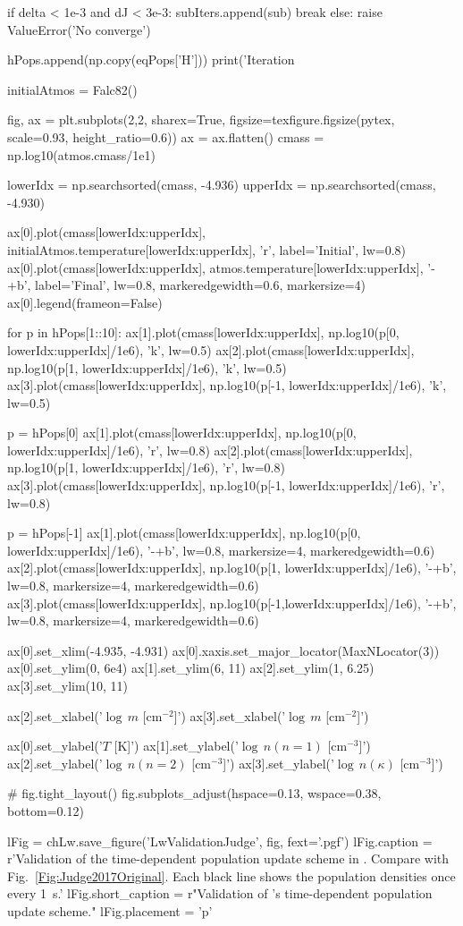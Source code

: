 \begin{pycode}[Lw]
        if delta < 1e-3 and dJ < 3e-3:
            subIters.append(sub)
            break
    else:
        raise ValueError('No converge')

    hPops.append(np.copy(eqPops['H']))
    print('Iteration %


initialAtmos = Falc82()

fig, ax = plt.subplots(2,2, sharex=True, figsize=texfigure.figsize(pytex, scale=0.93, height_ratio=0.6))
ax = ax.flatten()
cmass = np.log10(atmos.cmass/1e1)

lowerIdx = np.searchsorted(cmass, -4.936)
upperIdx = np.searchsorted(cmass, -4.930)

ax[0].plot(cmass[lowerIdx:upperIdx], initialAtmos.temperature[lowerIdx:upperIdx], 'r', label='Initial', lw=0.8)
ax[0].plot(cmass[lowerIdx:upperIdx], atmos.temperature[lowerIdx:upperIdx], '-+b', label='Final', lw=0.8, markeredgewidth=0.6, markersize=4)
ax[0].legend(frameon=False)

for p in hPops[1::10]:
    ax[1].plot(cmass[lowerIdx:upperIdx], np.log10(p[0, lowerIdx:upperIdx]/1e6), 'k', lw=0.5)
    ax[2].plot(cmass[lowerIdx:upperIdx], np.log10(p[1, lowerIdx:upperIdx]/1e6), 'k', lw=0.5)
    ax[3].plot(cmass[lowerIdx:upperIdx], np.log10(p[-1, lowerIdx:upperIdx]/1e6), 'k', lw=0.5)

p = hPops[0]
ax[1].plot(cmass[lowerIdx:upperIdx], np.log10(p[0, lowerIdx:upperIdx]/1e6), 'r', lw=0.8)
ax[2].plot(cmass[lowerIdx:upperIdx], np.log10(p[1, lowerIdx:upperIdx]/1e6), 'r', lw=0.8)
ax[3].plot(cmass[lowerIdx:upperIdx], np.log10(p[-1, lowerIdx:upperIdx]/1e6), 'r', lw=0.8)

p = hPops[-1]
ax[1].plot(cmass[lowerIdx:upperIdx], np.log10(p[0, lowerIdx:upperIdx]/1e6),  '-+b', lw=0.8, markersize=4, markeredgewidth=0.6)
ax[2].plot(cmass[lowerIdx:upperIdx], np.log10(p[1, lowerIdx:upperIdx]/1e6),  '-+b', lw=0.8, markersize=4, markeredgewidth=0.6)
ax[3].plot(cmass[lowerIdx:upperIdx], np.log10(p[-1,lowerIdx:upperIdx]/1e6), '-+b', lw=0.8, markersize=4, markeredgewidth=0.6)

ax[0].set_xlim(-4.935, -4.931)
ax[0].xaxis.set_major_locator(MaxNLocator(3))
ax[0].set_ylim(0, 6e4)
ax[1].set_ylim(6, 11)
ax[2].set_ylim(1, 6.25)
ax[3].set_ylim(10, 11)

ax[2].set_xlabel('$\log\,m$ [cm$^{-2}$]')
ax[3].set_xlabel('$\log\,m$ [cm$^{-2}$]')

ax[0].set_ylabel('$T$ [K]')
ax[1].set_ylabel('$\log\,n(n=1)$ [cm$^{-3}$]')
ax[2].set_ylabel('$\log\,n(n=2)$ [cm$^{-3}$]')
ax[3].set_ylabel('$\log\,n(\kappa)$ [cm$^{-3}$]')

# fig.tight_layout()
fig.subplots_adjust(hspace=0.13, wspace=0.38, bottom=0.12)

lFig = chLw.save_figure('LwValidationJudge', fig, fext='.pgf')
lFig.caption = r'Validation of the time-dependent population update scheme in \Lw{}. Compare with Fig.~\ref{Fig:Judge2017Original}. Each black line shows the population densities once every \SI{1}{\second}.'
lFig.short_caption = r"Validation of \Lw{}'s time-dependent population update scheme."
lFig.placement = 'p'
\end{pycode}

